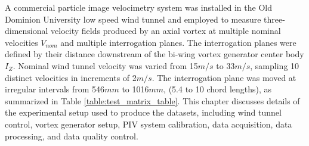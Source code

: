 A commercial particle image velocimetry system was installed in the Old 
Dominion University low 
speed 
wind tunnel and employed to measure three-dimensional velocity fields produced 
by an axial vortex at multiple nominal velocities $V_{nom}$ and multiple 
interrogation planes. The interrogation planes were defined by their 
distance downstream of the bi-wing vortex generator center body
$I_Z$. Nominal wind tunnel velocity was varied from 15$m/s$ to 33$m/s$, 
sampling 10 distinct velocities in increments of 2$m/s$. The interrogation 
plane was moved at irregular intervals from 546$mm$ to 1016$mm$, (5.4 to 10 
chord lengths), as summarized in Table \ref{table:test_matrix_table}. This 
chapter 
discusses details of the experimental setup used to produce the datasets, 
including wind tunnel control, vortex generator setup, PIV system calibration, 
data acquisition, data processing, and data quality control.